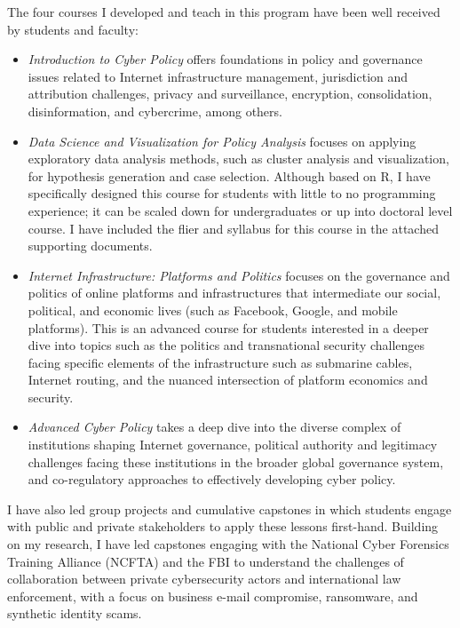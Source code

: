 \documentclass[11pt]{letter}
\begin{document}
\begin{letter}
The four courses I developed and teach in this program have been well received by students and faculty:
%
\begin{itemize}
  \item \emph{Introduction to Cyber Policy} offers foundations in policy and governance issues related to Internet infrastructure management, jurisdiction and attribution challenges, privacy and surveillance, encryption, consolidation, disinformation, and cybercrime, among others.  \item \emph{Data Science and Visualization for Policy Analysis} focuses on applying exploratory data analysis methods, such as cluster analysis and visualization, for hypothesis generation and case selection.  Although based on R, I have specifically designed this course for students with little to no programming experience; it can be scaled down for undergraduates or up into doctoral level course.  I have included the flier and syllabus for this course in the attached supporting documents.
  \item \emph{Internet Infrastructure: Platforms and Politics} focuses on the governance and politics of online platforms and infrastructures that intermediate our social, political, and economic lives (such as Facebook, Google, and mobile platforms).  This is an advanced course for students interested in a deeper dive into topics such as the politics and transnational security challenges facing specific elements of the infrastructure such as submarine cables, Internet routing, and the nuanced intersection of platform economics and security.
  \item \emph{Advanced Cyber Policy} takes a deep dive into the diverse complex of institutions shaping Internet governance, political authority and legitimacy challenges facing these institutions in the broader global governance system, and co-regulatory approaches to effectively developing cyber policy.
\end{itemize}
%

I have also led group projects and cumulative capstones in which students engage with public and private stakeholders to apply these lessons first-hand.
%
Building on my research, I have led capstones engaging with the National Cyber Forensics Training Alliance (NCFTA) and the FBI to understand the challenges of collaboration between private cybersecurity actors and international law enforcement, with a focus on business e-mail compromise, ransomware, and synthetic identity scams.  



\end{letter}
\end{document}
